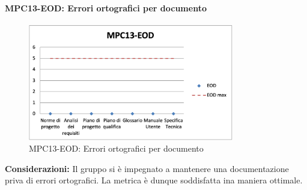 \paragraph{MPC13-EOD: Errori ortografici per documento}
\begin{figure}[h!] 
    \centering
    \includegraphics[width=0.8\textwidth]{images/MPC13-EOD.png}
    \caption{MPC13-EOD: Errori ortografici per documento}
\end{figure}
\noindent \textbf{Considerazioni:} Il gruppo si è impegnato a mantenere una documentazione priva di errori ortografici. La metrica è dunque soddisfatta ina maniera ottimale.


